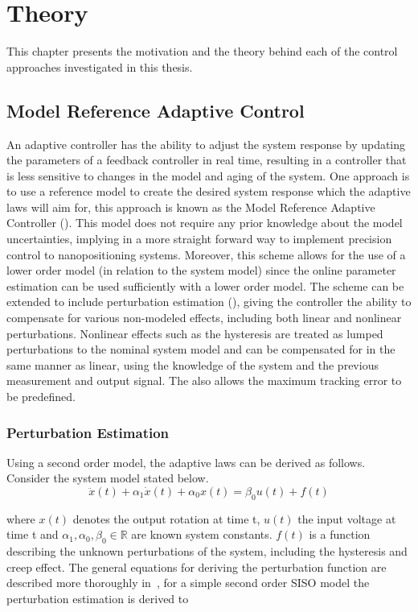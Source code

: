 \chapter{Theory}\label{cha:modelling}
This chapter presents the motivation and the theory behind each of the control approaches investigated in this thesis.

\section{Model Reference Adaptive Control}
An adaptive controller has the ability to adjust the system response by updating the parameters of a feedback controller in real time, resulting in a controller that is less sensitive to changes in the model and aging of the system. One approach is to use a reference model to create the desired system response which the adaptive laws will aim for, this approach is known as the Model Reference Adaptive Controller (\abbrMRAC). This model does not require any prior knowledge about the model uncertainties, implying in a more straight forward way to implement precision control to nanopositioning systems. Moreover, this scheme allows for the use of a lower order model (in relation to the system model) since the online parameter estimation can be used sufficiently with a lower order model. The \abbrMRAC scheme can be extended to include perturbation estimation (\abbrMRACPE), giving the controller the ability to compensate for various non-modeled effects, including both linear and nonlinear perturbations. Nonlinear effects such as the hysteresis are treated as lumped perturbations to the nominal system model and can be compensated for in the same manner as linear, using the knowledge of the system and the previous measurement and output signal. The \abbrMRACPE also allows the maximum tracking error to be predefined.

\subsection{Perturbation Estimation}\label{sec:pertest}
Using a second order model, the adaptive laws can be derived as follows. Consider the system model stated below.
\begin{equation}
  \label{eq:sysmodel}
  \ddot{x}(t) + \alpha_1\dot{x}(t) +  \alpha_0x(t) = \beta_0u(t) + f(t)
\end{equation}

where $x(t)$ denotes the output rotation at time t, $u(t)$ the input voltage at time t and $\alpha_1, \alpha_0, \beta_0 \in \mathbb{R}$ are known system constants. $f(t)$ is a function describing the unknown perturbations of the system, including the hysteresis and creep effect. The general equations for deriving the perturbation function are described more thoroughly in~\cite{Elmali:1996}, for a simple second order SISO model the perturbation estimation is derived to

